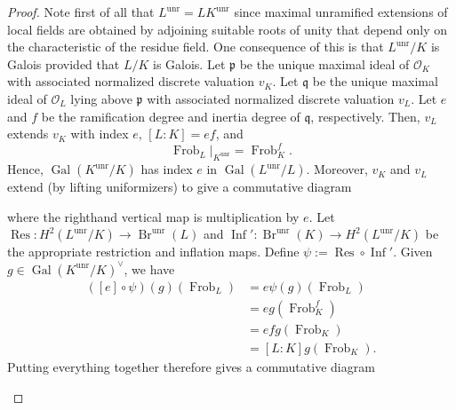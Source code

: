 \documentclass[11pt]{article}
\newcommand{\Q}{\mathbb{Q}}
\newcommand{\Z}{\mathbb{Z}}
\newcommand{\mc}[1]{\mathcal{#1}}
\newcommand{\mf}[1]{\mathfrak{#1}}
\DeclareMathOperator{\Br}{Br} %
\DeclareMathOperator{\Frob}{Frob} %
\DeclareMathOperator{\Gal}{Gal}
\DeclareMathOperator{\Inf}{Inf} %
\DeclareMathOperator{\Res}{Res} %
\DeclareMathOperator{\unr}{unr} %
\renewcommand{\O}{\mc{O}}
\begin{document}
\begin{proof}
Note first of all that $L^{\unr}=LK^{\unr}$ since maximal unramified extensions of local fields are obtained by adjoining suitable roots of unity that depend only on the characteristic of the residue field. One consequence of this is that $L^{\unr}/K$ is Galois provided that $L/K$ is Galois. Let $\mf{p}$ be the unique maximal ideal of $\O_K$ with associated normalized discrete valuation $v_K$. Let $\mf{q}$ be the unique maximal ideal of $\O_L$ lying above $\mf{p}$ with associated normalized discrete valuation $v_L$. Let $e$ and $f$ be the ramification degree and inertia degree of $\mf{q}$, respectively. Then, $v_L$ extends $v_K$ with index $e$, $[L:K]=ef$, and
$$\Frob_L|_{K^{\unr}}=\Frob_K^f.$$
Hence, $\Gal(K^{\unr}/K)$ has index $e$ in $\Gal(L^{\unr}/L)$. Moreover, $v_K$ and $v_L$ extend (by lifting uniformizers) to give a commutative diagram
\begin{center}
\end{center}
where the righthand vertical map is multiplication by $e$. Let $\Res: H^2(L^{\unr}/K)\to\Br^{\unr}(L)$ and $\Inf': \Br^{\unr}(K)\to H^2(L^{\unr}/K)$ be the appropriate restriction and inflation maps. Define $\psi:=\Res\circ\Inf'$. Given $g\in\Gal(K^{\unr}/K)^{\vee}$, we have
\begin{align*}
([e]\circ\psi)(g)(\Frob_L)
&=e\psi(g)(\Frob_L) \\
&=eg(\Frob_K^f) \\
&=efg(\Frob_K) \\
&=[L:K]g(\Frob_K).
\end{align*}
Putting everything together therefore gives a commutative diagram 
\begin{center}
\end{center}

\end{proof}
\end{document}
